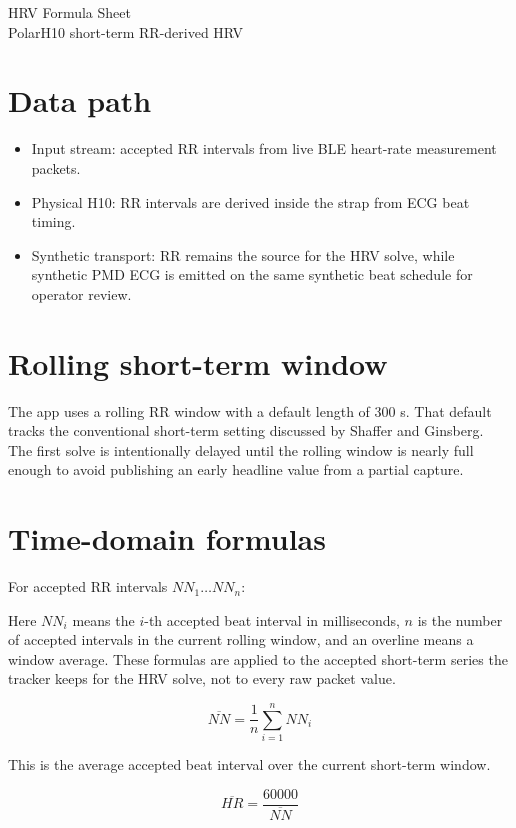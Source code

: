 \documentclass[11pt]{article}
\begin{document}
\begin{center}
{\LARGE HRV Formula Sheet}\\[0.5em]
{\large PolarH10 short-term RR-derived HRV}
\end{center}

\section*{Data path}

\begin{itemize}[leftmargin=1.5em]
\item Input stream: accepted RR intervals from live BLE heart-rate measurement packets.
\item Physical H10: RR intervals are derived inside the strap from ECG beat timing.
\item Synthetic transport: RR remains the source for the HRV solve, while synthetic PMD ECG is emitted on the same synthetic beat schedule for operator review.
\end{itemize}

\section*{Rolling short-term window}

The app uses a rolling RR window with a default length of $300$ s. That default
tracks the conventional short-term setting discussed by Shaffer and Ginsberg.
The first solve is intentionally delayed until the rolling window is nearly full
enough to avoid publishing an early headline value from a partial capture.

\section*{Time-domain formulas}

For accepted RR intervals $NN_1 \ldots NN_n$:

Here $NN_i$ means the $i$-th accepted beat interval in milliseconds, $n$ is the
number of accepted intervals in the current rolling window, and an overline
means a window average. These formulas are applied to the accepted short-term
series the tracker keeps for the HRV solve, not to every raw packet value.

\[
\overline{NN} = \frac{1}{n}\sum_{i=1}^{n} NN_i
\]

This is the average accepted beat interval over the current short-term window.

\[
\overline{HR} = \frac{60000}{\overline{NN}}
\]
\end{document}
